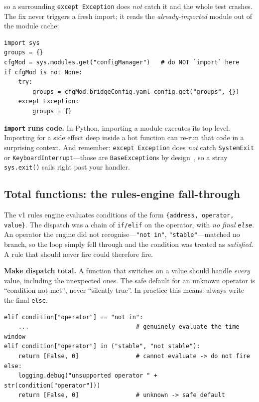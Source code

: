 \documentclass[11pt,a4paper]{article}
\newcommand{\code}[1]{\texttt{#1}}
\begin{document}
so a surrounding \code{except Exception} does \emph{not} catch it and the whole
test crashes. The fix never triggers a fresh import; it reads the
\emph{already-imported} module out of the module cache:

\begin{lstlisting}
import sys
groups = {}
cfgMod = sys.modules.get("configManager")   # do NOT `import` here
if cfgMod is not None:
    try:
        groups = cfgMod.bridgeConfig.yaml_config.get("groups", {})
    except Exception:
        groups = {}
\end{lstlisting}

\begin{pitfall}
\textbf{\code{import} runs code.} In Python, importing a module executes its
top level. Importing for a side effect deep inside a hot function can re-run
that code in a surprising context. And remember: \code{except Exception} does
\emph{not} catch \code{SystemExit} or \code{KeyboardInterrupt}---those are
\code{BaseException}s by design~\cite{pyexc}, so a stray \code{sys.exit()} sails right past
your handler.
\end{pitfall}

\subsection{Total functions: the rules-engine fall-through}

The v1 rules engine evaluates conditions of the form
\code{\{address, operator, value\}}. The dispatch was a chain of
\code{if/elif} on the operator, with \emph{no final \code{else}}. An operator
the engine did not recognise---\code{"not in"}, \code{"stable"}---matched no
branch, so the loop simply fell through and the condition was treated as
\emph{satisfied}. A rule that should never fire could therefore fire.

\begin{keyidea}
\textbf{Make dispatch total.} A function that switches on a value should handle
\emph{every} value, including the unexpected ones. The safe default for an
unknown operator is ``condition not met'', never ``silently true''. In practice
this means: always write the final \code{else}.
\end{keyidea}

\begin{lstlisting}
elif condition["operator"] == "not in":
    ...                              # genuinely evaluate the time window
elif condition["operator"] in ("stable", "not stable"):
    return [False, 0]                # cannot evaluate -> do not fire
else:
    logging.debug("unsupported operator " + str(condition["operator"]))
    return [False, 0]                # unknown -> safe default
\end{lstlisting}
\end{document}
